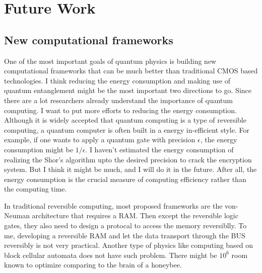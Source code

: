 \documentclass[a4paper]{article}
\newcommand{\<}{\langle}
\renewcommand{\>}{\rangle}
\begin{document}
\section{Future Work}


\subsection{New computational frameworks}
One of the most important goals of quantum physics is building new computational frameworks that can be much better than traditional CMOS based technologies.
I think reducing the energy consumption and making use of quantum entanglement might be the most important two directions to go.
Since there are a lot researchers already understand the importance of quantum computing.
I want to put more efforts to reducing the energy consumption. Although it is widely accepted that quantum computing is a type of reversible computing, a quantum computer is often built in a energy in-efficient style.
For example, if one wants to apply a quantum gate with precision $\epsilon$, the energy consumption might be $1/\epsilon$.
I haven't estimated the energy consumption of realizing the Shor's algorithm upto the desired precision to crack the encryption system.
But I think it might be much, and I will do it in the future.
After all, the energy consumption is the crucial measure of computing efficiency rather than the computing time.




In traditional reversible computing, most proposed frameworks are the von-Neuman architecture that requires a RAM.
Then except the reversible logic gates, they also need to design a protocal to access the memory reversiblly.
To me, developing a reversible RAM and let the data transport through the BUS reversibly is not very practical.
Another type of physics like computing based on block cellular automata does not have such problem.
There might be $10^6$ room known to optimize comparing to the brain of a honeybee.
\end{document}
